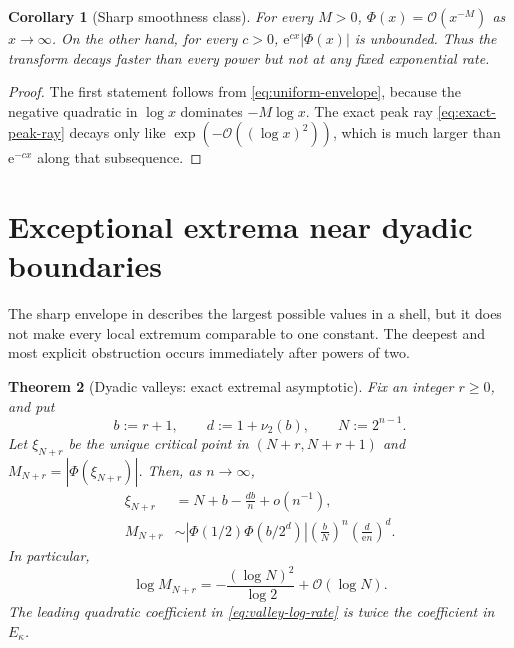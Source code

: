 \documentclass[11pt,oneside]{article}
\newtheorem{theorem}{Theorem}[section]
\newtheorem{corollary}[theorem]{Corollary}
\theoremstyle{definition}
\theoremstyle{remark}
\newcommand{\e}{\mathrm e}
\newcommand{\Phiup}{\Phi}
\newcommand{\bigO}{\mathcal O}
\newcommand{\vtwo}{\nu_2}
\newcommand{\abs}[1]{\left|#1\right|}
\begin{document}
\begin{corollary}[Sharp smoothness class]
\label{cor:superpoly-subexp}
For every $M>0$, $\Phiup(x)=\bigO(x^{-M})$ as $x\to\infty$.  On the other hand, for every
$c>0$, $\e^{cx}\abs{\Phiup(x)}$ is unbounded.  Thus the transform decays faster than every
power but not at any fixed exponential rate.
\end{corollary}

\begin{proof}
The first statement follows from \eqref{eq:uniform-envelope}, because the negative
quadratic in $\log x$ dominates $-M\log x$.  The exact peak ray
\eqref{eq:exact-peak-ray} decays only like $\exp(-\bigO((\log x)^2))$, which is much larger
than $\e^{-cx}$ along that subsequence.
\end{proof}

\section{Exceptional extrema near dyadic boundaries}
\label{sec:exceptional-extrema}

The sharp envelope in  describes the largest possible values in
a shell, but it does not make every local extremum comparable to one constant.  The deepest
and most explicit obstruction occurs immediately after powers of two.

\begin{theorem}[Dyadic valleys: exact extremal asymptotic]
\label{thm:dyadic-valleys}
Fix an integer $r\ge0$, and put
\[
 b:=r+1,
 \qquad
 d:=1+\vtwo(b),
 \qquad
 N:=2^{n-1}.
\]
Let $\xi_{N+r}$ be the unique critical point in $(N+r,N+r+1)$ and
$M_{N+r}=\abs{\Phiup(\xi_{N+r})}$.  Then, as $n\to\infty$,
\begin{align}
 \xi_{N+r}
 &=N+b-\frac{db}{n}+o(n^{-1}),
 \label{eq:valley-location}\\
 M_{N+r}
 &\sim
 \abs{\Phiup(1/2)\Phiup(b/2^d)}
 \left(\frac bN\right)^n
 \left(\frac d{\e n}\right)^d.
 \label{eq:valley-amplitude}
\end{align}
In particular,
\begin{equation}
 \log M_{N+r}
 =-\frac{(\log N)^2}{\log2}+\bigO(\log N).
 \label{eq:valley-log-rate}
\end{equation}
The leading quadratic coefficient in \eqref{eq:valley-log-rate} is twice the coefficient in
$E_\kappa$.
\end{theorem}
\end{document}
